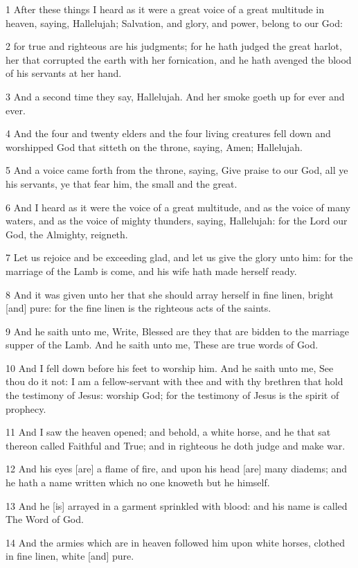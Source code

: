 \par 1 After these things I heard as it were a great voice of a great multitude in heaven, saying, Hallelujah; Salvation, and glory, and power, belong to our God:
\par 2 for true and righteous are his judgments; for he hath judged the great harlot, her that corrupted the earth with her fornication, and he hath avenged the blood of his servants at her hand.
\par 3 And a second time they say, Hallelujah. And her smoke goeth up for ever and ever.
\par 4 And the four and twenty elders and the four living creatures fell down and worshipped God that sitteth on the throne, saying, Amen; Hallelujah.
\par 5 And a voice came forth from the throne, saying, Give praise to our God, all ye his servants, ye that fear him, the small and the great.
\par 6 And I heard as it were the voice of a great multitude, and as the voice of many waters, and as the voice of mighty thunders, saying, Hallelujah: for the Lord our God, the Almighty, reigneth.
\par 7 Let us rejoice and be exceeding glad, and let us give the glory unto him: for the marriage of the Lamb is come, and his wife hath made herself ready.
\par 8 And it was given unto her that she should array herself in fine linen, bright [and] pure: for the fine linen is the righteous acts of the saints.
\par 9 And he saith unto me, Write, Blessed are they that are bidden to the marriage supper of the Lamb. And he saith unto me, These are true words of God.
\par 10 And I fell down before his feet to worship him. And he saith unto me, See thou do it not: I am a fellow-servant with thee and with thy brethren that hold the testimony of Jesus: worship God; for the testimony of Jesus is the spirit of prophecy.
\par 11 And I saw the heaven opened; and behold, a white horse, and he that sat thereon called Faithful and True; and in righteous he doth judge and make war.
\par 12 And his eyes [are] a flame of fire, and upon his head [are] many diadems; and he hath a name written which no one knoweth but he himself.
\par 13 And he [is] arrayed in a garment sprinkled with blood: and his name is called The Word of God.
\par 14 And the armies which are in heaven followed him upon white horses, clothed in fine linen, white [and] pure.
